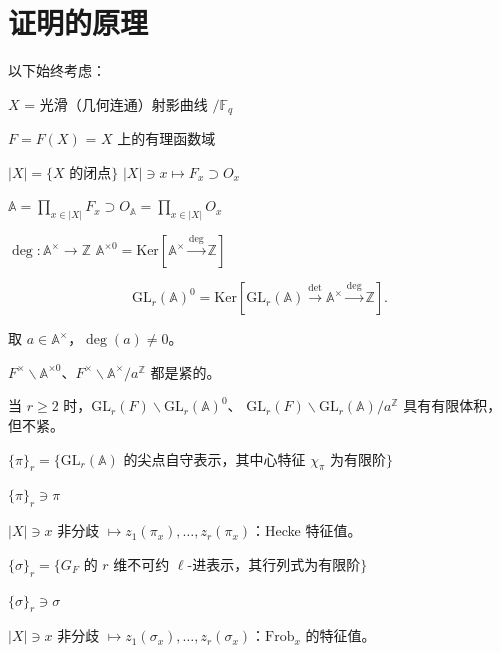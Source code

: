 
\section{证明的原理}

以下始终考虑：

$X$ = 光滑（几何连通）射影曲线 $/\mathbb{F}_q$

$F = F(X)$ = $X$ 上的有理函数域

$|X| = \{\text{$X$ 的闭点}\}$ \qquad $|X| \ni x \mapsto F_x \supset O_x$

$\mathbb{A} = \prod_{x \in |X|} F_x \supset O_{\mathbb{A}} = \prod_{x \in |X|} O_x$

$\deg : \mathbb{A}^\times \to \mathbb{Z}$ \qquad
$\mathbb{A}^{\times 0} = \mathrm{Ker}[\mathbb{A}^\times \xrightarrow{\deg} \mathbb{Z}]$

\[ \mathrm{GL}_r(\mathbb{A})^0 = \mathrm{Ker}[\mathrm{GL}_r(\mathbb{A}) \xrightarrow{\det} \mathbb{A}^\times \xrightarrow{\deg} \mathbb{Z}]. \]

取 $a \in \mathbb{A}^\times$，$\deg(a) \neq 0$。

$F^\times\backslash \mathbb{A}^{\times 0}$、$F^\times\backslash \mathbb{A}^\times/a^{\mathbb{Z}}$ 都是紧的。

当 $r \ge 2$ 时，$\mathrm{GL}_r(F)\backslash \mathrm{GL}_r(\mathbb{A})^0$、
$\mathrm{GL}_r(F)\backslash \mathrm{GL}_r(\mathbb{A})/a^{\mathbb{Z}}$ 具有有限体积，但不紧。

$\{\pi\}_r = \{\text{$\mathrm{GL}_r(\mathbb{A})$ 的尖点自守表示，其中心特征 $\chi_\pi$ 为有限阶}\}$

$\{\pi\}_r \ni \pi$

$|X| \ni x$ 非分歧 $\mapsto z_1(\pi_x), \ldots, z_r(\pi_x)$：Hecke 特征值。

$\{\sigma\}_r = \{\text{$G_F$ 的 $r$ 维不可约 $\ell$-进表示，其行列式为有限阶}\}$

$\{\sigma\}_r \ni \sigma$

$|X| \ni x$ 非分歧 $\mapsto z_1(\sigma_x), \ldots, z_r(\sigma_x)$：$\mathrm{Frob}_x$ 的特征值。

